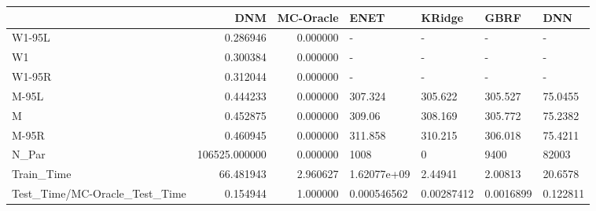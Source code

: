 \begin{tabular}{lrrllll}
\toprule
{} &            DNM &  MC-Oracle &         ENET &      KRidge &       GBRF &       DNN \\
\midrule
W1-95L                        &       0.286946 &   0.000000 &            - &           - &          - &         - \\
W1                            &       0.300384 &   0.000000 &            - &           - &          - &         - \\
W1-95R                        &       0.312044 &   0.000000 &            - &           - &          - &         - \\
M-95L                         &       0.444233 &   0.000000 &      307.324 &     305.622 &    305.527 &   75.0455 \\
M                             &       0.452875 &   0.000000 &       309.06 &     308.169 &    305.772 &   75.2382 \\
M-95R                         &       0.460945 &   0.000000 &      311.858 &     310.215 &    306.018 &   75.4211 \\
N\_Par                         &  106525.000000 &   0.000000 &         1008 &           0 &       9400 &     82003 \\
Train\_Time                    &      66.481943 &   2.960627 &  1.62077e+09 &     2.44941 &    2.00813 &   20.6578 \\
Test\_Time/MC-Oracle\_Test\_Time &       0.154944 &   1.000000 &  0.000546562 &  0.00287412 &  0.0016899 &  0.122811 \\
\bottomrule
\end{tabular}
